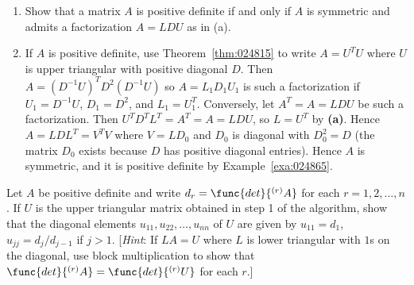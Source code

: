 \begin{multicols}{2}
\begin{ex}
\begin{enumerate}[label={\alph*.}]
\item Show that a matrix $A$ is positive definite if and only if $A$ is symmetric and admits a factorization $A = LDU$ as in (a).
\end{enumerate}
\begin{sol}
\begin{enumerate}[label={\alph*.}]
\setcounter{enumi}{1}
\item  If $A$ is positive definite, use Theorem~\ref{thm:024815} to write $A = U^{T}U$ where $U$ is upper triangular with positive diagonal $D$. Then $A = (D^{-1}U)^{T}D^{2}(D^{-1}U)$ so $A = L_{1}D_{1}U_{1}$ is such a factorization if $U_{1} = D^{-1}U$, $D_{1} = D^{2}$, and $L_{1} = U^T_1$. Conversely, let $A^{T} = A = LDU$ be such a factorization. Then $U^{T}D^{T}L^{T} = A^{T} = A = LDU$, so $L = U^{T}$ by \textbf{(a)}. Hence $A = LDL^{T} = V^{T}V$ where $V = LD_{0}$ and $D_{0}$ is diagonal with $D^2_0 = D$ (the matrix $D_{0}$ exists because $D$ has positive diagonal entries). Hence $A$ is symmetric, and it is positive definite by Example~\ref{exa:024865}.

\end{enumerate}
\end{sol}
\end{ex}
 

\begin{ex}
Let $A$ be positive definite and write $d_{r} = \func{det}{^{(r)}A}$ for each $r = 1, 2, \dots, n$. If $U$ is the upper triangular matrix obtained in step 1 of the algorithm, show that the diagonal elements $u_{11}, u_{22}, \dots, u_{nn}$ of $U$ are given by $u_{11} = d_{1}$, $u_{jj} = d_{j} / d_{j-1}$ if $j > 1$. [\textit{Hint}: If $LA = U$ where $L$ is lower triangular with $1$s on the diagonal, use block multiplication to show that $\func{det}{^{(r)}A} = \func{det}{^{(r)}U}$ for each $r$.]
\end{ex}
\end{multicols}




























